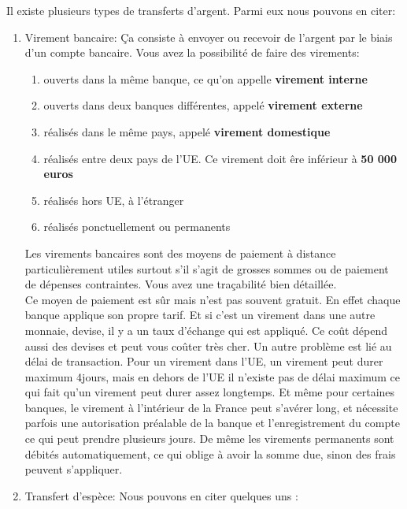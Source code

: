\documentclass[12pt]{report}
\begin{document}
Il existe plusieurs types de transferts  d'argent. Parmi eux nous pouvons en citer: 

\begin{enumerate}
    \item Virement bancaire: Ça consiste à envoyer ou recevoir de l'argent par le biais d'un compte bancaire. Vous avez la possibilité de faire des virements: 
    
    \begin{enumerate}
        \item ouverts dans la même banque, ce qu'on appelle \textbf{virement interne}
        \item ouverts dans deux banques différentes, appelé \textbf{virement externe}
        \item réalisés dans le même pays, appelé \textbf{virement domestique}
        \item réalisés entre deux pays de l'UE. Ce virement doit êre inférieur à \textbf{50 000 euros}
        \item réalisés hors UE, à l'étranger
        \item réalisés ponctuellement ou permanents 
    \end{enumerate}
Les virements bancaires sont des moyens de paiement à distance particulièrement utiles surtout s'il s'agit de grosses sommes ou de paiement de dépenses contraintes. Vous avez une traçabilité bien détaillée.\\

\hspace{1cm} Ce moyen de paiement est sûr mais n'est pas souvent gratuit. En effet chaque banque applique son propre tarif. Et si c'est un virement dans une autre monnaie, devise, il y a un taux d'échange qui est appliqué. Ce coût dépend aussi des devises et peut vous coûter très cher. Un autre problème est lié au délai de transaction. Pour un virement dans l'UE, un virement peut durer maximum 4jours, mais en dehors de l'UE il n'existe pas de délai maximum ce qui fait qu'un virement peut durer assez longtemps. Et même pour certaines banques,  le virement à l'intérieur de la France peut s'avérer long, et nécessite parfois une autorisation préalable de la banque et l'enregistrement du compte ce qui peut prendre plusieurs jours. De même les virements permanents sont débités automatiquement, ce qui oblige à avoir la somme due, sinon des frais peuvent s'appliquer.

    \item Transfert d'espèce: Nous pouvons en citer quelques uns : 
    

\end{enumerate}
\end{document}
